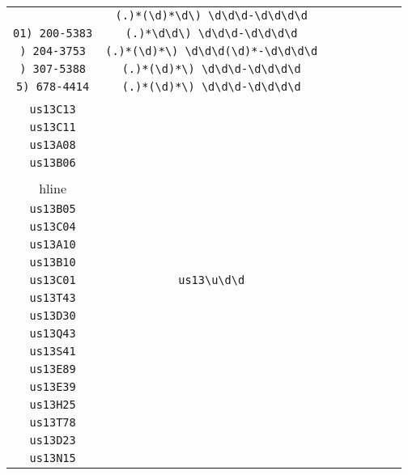 \begin{longtable}{cccccccc}
\begin{tabular}{ll}
    \verb|Yl0) 643-7484| & \verb|(.)*(\d)*\d\) \d\d\d-\d\d\d\d|\\
\verb|01) 200-5383| & \verb|(.)*\d\d\) \d\d\d-\d\d\d\d|\\
\verb|) 204-3753| & \verb|(.)*(\d)*\) \d\d\d(\d)*-\d\d\d\d|\\
\verb|) 307-5388| & \verb|(.)*(\d)*\) \d\d\d-\d\d\d\d|\\
\verb|5) 678-4414| & \verb|(.)*(\d)*\) \d\d\d-\d\d\d\d|
\end{tabular}
\\\midrule 
\begin{tabular}{l}
    \verb|us13C03|\\
\verb|us13C13|\\
\verb|us13C11|\\
\verb|us13A08|\\
\verb|us13B06|\\
\\hline\\
\verb|us13B05|\\
\verb|us13C04|\\
\verb|us13A10|\\
\verb|us13B10|\\
\verb|us13C01|
\end{tabular}

&
\verb|us13\u\d\d|
&

\begin{tabular}{l}
    \verb|us13\u\d\d|\\
\verb|us13T43|\\
\verb|us13D30|\\
\verb|us13Q43|\\
\verb|us13S41|\\
\verb|us13E89|
\end{tabular}

&

\begin{tabular}{l}
    \verb|us13\u\d\d|\\
\verb|us13E39|\\
\verb|us13H25|\\
\verb|us13T78|\\
\verb|us13D23|\\
\verb|us13N15|
\end{tabular}

&


\end{longtable}
